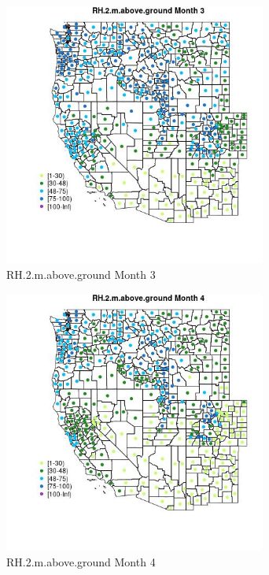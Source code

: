 \begin{figure} 
\centering  
\includegraphics[width=0.77\textwidth]{Code_Outputs/df_report_ML_predictors_CountyCentroid_Locations_Dates_2008-01-01to2018-12-31_MapObsMo3RH2maboveground.jpg} 
\caption{\label{fig:df_report_ML_predictors_CountyCentroid_Locations_Dates_2008-01-01to2018-12-31MapObsMo3RH2maboveground}RH.2.m.above.ground Month 3} 
\end{figure} 
 

\clearpage 

\begin{figure} 
\centering  
\includegraphics[width=0.77\textwidth]{Code_Outputs/df_report_ML_predictors_CountyCentroid_Locations_Dates_2008-01-01to2018-12-31_MapObsMo4RH2maboveground.jpg} 
\caption{\label{fig:df_report_ML_predictors_CountyCentroid_Locations_Dates_2008-01-01to2018-12-31MapObsMo4RH2maboveground}RH.2.m.above.ground Month 4} 
\end{figure} 
 

